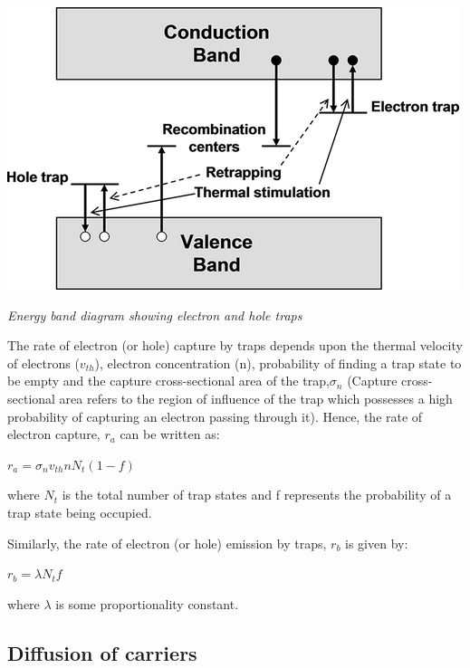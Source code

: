 \documentclass[12 pt]{article}
\begin{document}
  \par
  \begin{center}
   \includegraphics{fig1_1_65.png}
   \end{center}
    \begin{center}
      \emph{\hspace{1.5cm}Energy band diagram showing electron and hole traps\newline}
  \end{center}
\par

The rate of electron (or hole) capture by traps depends upon the thermal velocity of electrons ($v_{th}$), electron concentration (n), probability of finding a trap state to be empty and the capture cross-sectional area of the trap,$\sigma_{n}$ (Capture cross-sectional area refers to the region of influence of the trap which possesses a high probability of capturing an electron passing through it). Hence, the rate of electron capture, $r_{a}$ can be written as:
\begin{center}
    $ r_{a} = \sigma_{n}v_{th}nN_{t}(1-f) $
\end{center}
where $N_{t}$ is the total number of trap states and f represents the probability of a trap state being occupied.\par
Similarly, the rate of electron (or hole) emission by traps, $r_{b}$ is given by:
\begin{center}
    $ r_{b} = \lambda N_{t}f $
\end{center}
where $\lambda$ is some proportionality constant.

\subsection{Diffusion of carriers}
\end{document}
